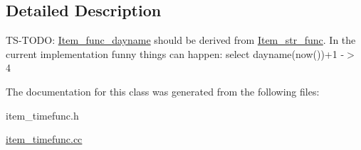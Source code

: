 \subsection{Detailed Description}
TS-\/T\+O\+DO\+: \mbox{\hyperlink{classItem__func__dayname}{Item\+\_\+func\+\_\+dayname}} should be derived from \mbox{\hyperlink{classItem__str__func}{Item\+\_\+str\+\_\+func}}. In the current implementation funny things can happen\+: select dayname(now())+1 -\/$>$ 4 

The documentation for this class was generated from the following files\+:\begin{DoxyCompactItemize}
\item 
item\+\_\+timefunc.\+h\item 
\mbox{\hyperlink{item__timefunc_8cc}{item\+\_\+timefunc.\+cc}}\end{DoxyCompactItemize}
